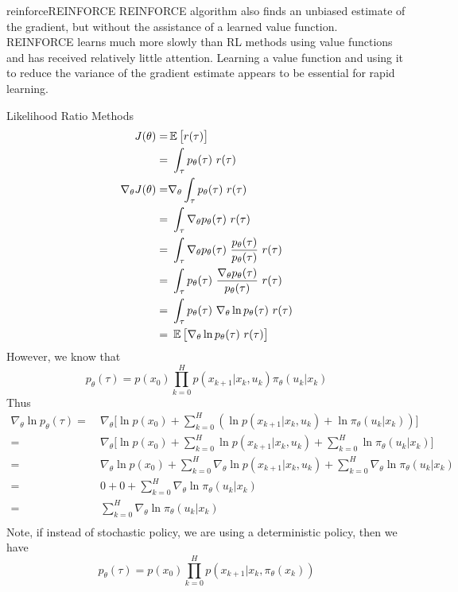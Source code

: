 \documentclass[9pt]{article}
\begin{document}
\begin{topic}{reinforce}{REINFORCE}
REINFORCE algorithm also finds an unbiased estimate of
the gradient, but without the assistance of a learned value function. REINFORCE
learns much more slowly than RL methods using value functions and has received
relatively little attention. Learning a value function and using it to reduce the variance
of the gradient estimate appears to be essential for rapid learning.

Likelihood Ratio Methods
\[
\begin{split}
	J(\theta) = & \E \big[r(\tau)\big] \\
	= &\ \int_{\tau} p_{\theta}(\tau)\ r(\tau)\\
	\nabla_{\theta} J(\theta) = & \nabla_{\theta} \int_{\tau} p_{\theta}(\tau)\ r(\tau)\\
	= &\ \int_{\tau} \nabla_{\theta} p_{\theta}(\tau)\ r(\tau)\\
	= &\ \int_{\tau} \nabla_{\theta} p_{\theta}(\tau)\ \frac{p_{\theta}(\tau)}{p_{\theta}(\tau)}\ r(\tau)\\
	= &\ \int_{\tau} p_{\theta}(\tau)\ \frac{\nabla_{\theta} p_{\theta}(\tau)}{p_{\theta}(\tau)}\ r(\tau)\\
	= &\ \int_{\tau} p_{\theta}(\tau)\ \nabla_{\theta} \ln p_{\theta}(\tau)\ r(\tau)\\
	= &\ \E \big[ \nabla_{\theta} \ln p_{\theta}(\tau)\ r(\tau) \big]
\end{split}
\]
However, we know that
\[
p_{\theta}(\tau) = p(x_0) \prod_{k=0}^{H}p(x_{k+1}|x_k,u_k)\pi_{\theta}(u_k|x_k)
\]
Thus
\[
\begin{split}
\nabla_{\theta} \ln p_{\theta}(\tau) = &\ \nabla_{\theta} \big[ \ln p(x_0) + \sum_{k=0}^{H} (\ln p(x_{k+1}|x_k,u_k) + \ln \pi_{\theta}(u_k|x_k))\big]\\
= &\ \nabla_{\theta} \big[ \ln p(x_0) + \sum_{k=0}^{H} \ln p(x_{k+1}|x_k,u_k) + \sum_{k=0}^{H} \ln \pi_{\theta}(u_k|x_k)\big]\\
= &\ \nabla_{\theta} \ln p(x_0) + \sum_{k=0}^{H} \nabla_{\theta} \ln p(x_{k+1}|x_k,u_k) + \sum_{k=0}^{H} \nabla_{\theta} \ln \pi_{\theta}(u_k|x_k)\\
= &\ 0 + 0 + \sum_{k=0}^{H} \nabla_{\theta} \ln \pi_{\theta}(u_k|x_k)\\
= &\ \sum_{k=0}^{H} \nabla_{\theta} \ln \pi_{\theta}(u_k|x_k)\\
\end{split}
\]
Note, if instead of stochastic policy, we are using a deterministic policy, then we have 
\[
p_{\theta}(\tau) = p(x_0) \prod_{k=0}^{H}p(x_{k+1}|x_k,\pi_{\theta}(x_k))
\]
\end{topic}
\end{document}
